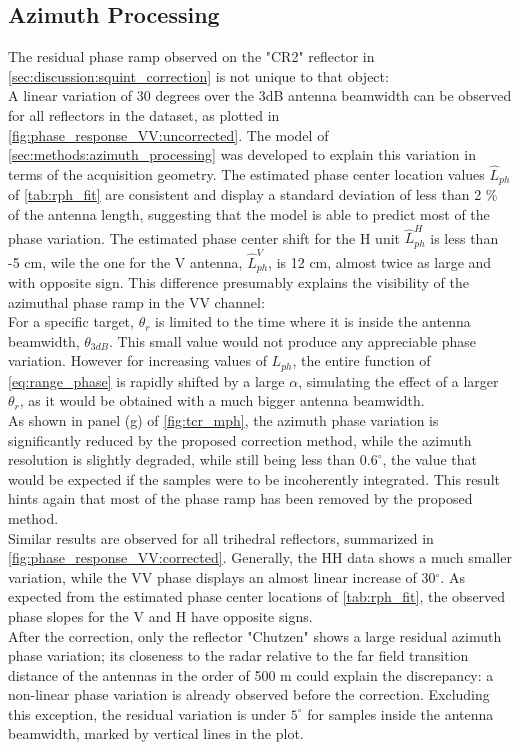 \subsection{Azimuth Processing}\label{sec:discussion:azimuth_processing}
The residual phase ramp observed on the "CR2" reflector in \autoref{sec:discussion:squint_correction} is not unique to that object:\\ A linear variation of 30 degrees over the 3dB antenna beamwidth can be observed for all reflectors in the dataset, as plotted in \autoref{fig:phase_response_VV:uncorrected}.  The model of \autoref{sec:methods:azimuth_processing} was developed to explain this variation in terms of the acquisition geometry.
The estimated phase center location values $\hat{L}_{ph}$ of \autoref{tab:rph_fit} are consistent and display a standard deviation of less than 2 \% of the antenna length, suggesting that the model is able to predict most of the phase variation. The estimated phase center shift for the H unit $\hat{L}_{ph}^{H}$ is less than -5 cm, wile the one for the V antenna, $\hat{L}_{ph}^{V}$, is 12 cm, almost twice as large and with opposite sign. This difference presumably explains the visibility of the azimuthal phase ramp in the VV channel:\\
For a specific target,  $\theta_r$ is limited to the time where it is inside the antenna beamwidth, $\theta_{3dB}$. This small value would not produce any appreciable phase variation. However for increasing values of $L_{ph}$, the entire function of \autoref{eq:range_phase} is rapidly shifted  by a large $\alpha$, simulating the effect of a larger $\theta_r$, as it would be obtained with a much bigger antenna beamwidth.\\
As shown in panel (g) of \autoref{fig:tcr_mph}, the azimuth phase variation is significantly reduced by the proposed correction method, while the azimuth resolution is slightly degraded, while still being less than $0.6^\circ$, the value that would be expected if the samples were to be incoherently integrated. This result hints again that most of the phase ramp has been removed by the proposed method.\\
Similar results are observed for all trihedral reflectors, summarized in \autoref{fig:phase_response_VV:corrected}.  Generally, the HH data shows a much smaller variation, while the VV phase displays an almost linear increase of 30$^\circ$. As expected from the estimated phase center locations of \autoref{tab:rph_fit}, the observed phase slopes for the V and H have opposite signs.\\  After the correction, only the reflector "Chutzen" shows a large residual azimuth phase variation; its closeness to the radar relative to the far field transition distance of the antennas in the order of 500 m could explain the discrepancy: a non-linear  phase variation is already observed before the correction. Excluding this exception, the residual variation is under $5^\circ$ for samples inside the antenna beamwidth, marked by vertical lines in the plot.

